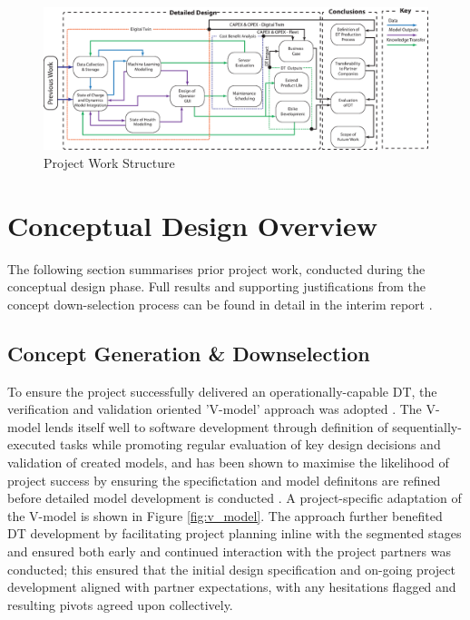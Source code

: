 \documentclass[a4paper, 10pt]{article}
\numberwithin{equation}{section}
\begin{document}
\begin{figure}[H]
    \centering
    \includegraphics[width = \textwidth]{images/Detailed_Design_v3.eps}
    \caption{Project Work Structure}
    \label{fig:detailed_design_flow}
\end{figure}



\newpage
\section{Conceptual Design Overview}
\label{sec:concept_gen}
The following section summarises prior project work, conducted during the conceptual design phase. Full results and supporting justifications from the concept down-selection process can be found in detail in the interim report \cite{interim_report}.

\subsection{Concept Generation \& Downselection}
To ensure the project successfully delivered an operationally-capable DT, the verification and validation oriented 'V-model' approach was adopted \cite{v_model}. The V-model lends itself well to software development through definition of sequentially-executed tasks while promoting regular evaluation of key design decisions and validation of created models, and has been shown to maximise the likelihood of project success by ensuring the specifictation and model definitons are refined before detailed model development is conducted \cite{v_model_proscons}. A project-specific adaptation of the V-model is shown in Figure \ref{fig:v_model}. The approach further benefited DT development by facilitating project planning inline with the segmented stages and ensured both early and continued interaction with the project partners was conducted; this ensured that the initial design specification and on-going project development aligned with partner expectations, with any hesitations flagged and resulting pivots agreed upon collectively.
\end{document}

